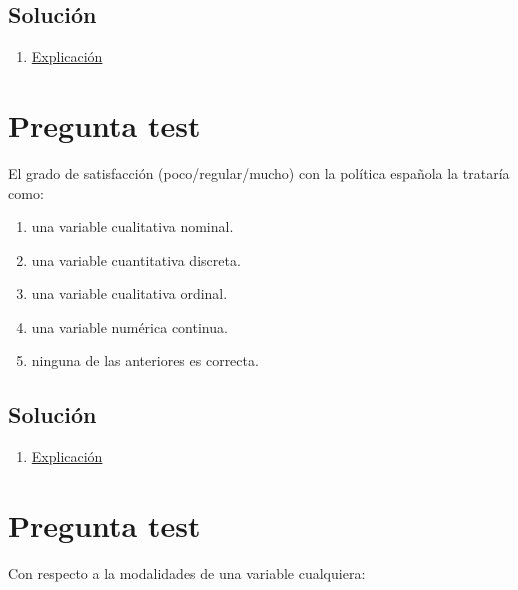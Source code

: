 \documentclass[
]{book}
\providecommand{\tightlist}{%
  \setlength{\itemsep}{0pt}\setlength{\parskip}{0pt}}
\begin{document}
\hypertarget{soluciuxf3n-11}{%
\subsection{Solución}\label{soluciuxf3n-11}}

\begin{enumerate}
\def\labelenumi{\alph{enumi})}
\tightlist
\item
  \href{https://1fjmanzano.github.io/bioestadistica/conceptos-previos.html}{Explicación}
\end{enumerate}

\hypertarget{pregunta-test-12}{%
\section{Pregunta test}\label{pregunta-test-12}}

El grado de satisfacción (poco/regular/mucho) con la política española la trataría como:

\begin{enumerate}
\def\labelenumi{\alph{enumi})}
\tightlist
\item
  una variable cualitativa nominal.
\item
  una variable cuantitativa discreta.
\item
  una variable cualitativa ordinal.
\item
  una variable numérica continua.
\item
  ninguna de las anteriores es correcta.
\end{enumerate}

\hypertarget{soluciuxf3n-12}{%
\subsection{Solución}\label{soluciuxf3n-12}}

\begin{enumerate}
\def\labelenumi{\alph{enumi})}
\setcounter{enumi}{2}
\tightlist
\item
  \href{https://1fjmanzano.github.io/bioestadistica/tipos-de-variables.html}{Explicación}
\end{enumerate}

\hypertarget{pregunta-test-13}{%
\section{Pregunta test}\label{pregunta-test-13}}

Con respecto a la modalidades de una variable cualquiera:
\end{document}
